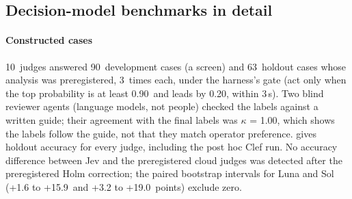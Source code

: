 \documentclass[11pt,letterpaper]{article}
\newcommand{\DevN}{90}
\newcommand{\HoldN}{63}
\newcommand{\HoldReps}{3}
\newcommand{\KappaHoldAB}{1.00}
\newcommand{\LunaHoldRAccDiffCI}{+1.6 to +15.9}
\newcommand{\MinMargin}{0.20}
\newcommand{\MinP}{0.90}
\newcommand{\NumBase}{10}
\newcommand{\SolHoldRAccDiffCI}{+3.2 to +19.0}
\newcommand{\TimeoutS}{3}
\begin{document}
\subsection{Decision-model benchmarks in detail}\label{sec:judges}

\paragraph{Constructed cases} \NumBase\ judges answered \DevN\ development cases (a screen) and \HoldN\ holdout cases
whose analysis was preregistered, \HoldReps\ times each, under the harness's gate (act only when the top probability
is at least \MinP\ and leads by \MinMargin, within \TimeoutS\,s). Two blind reviewer agents (language models, not people) checked the labels
against a written guide; their agreement with the final labels was $\kappa$ = \KappaHoldAB, which shows the labels
follow the guide, not that they match operator preference.  gives holdout
accuracy for every judge, including the post hoc Clef run. No accuracy difference between Jev and the preregistered
cloud judges was detected after the preregistered Holm correction; the paired bootstrap intervals for Luna and Sol
(\LunaHoldRAccDiffCI\ and \SolHoldRAccDiffCI\ points) exclude zero.
\end{document}
